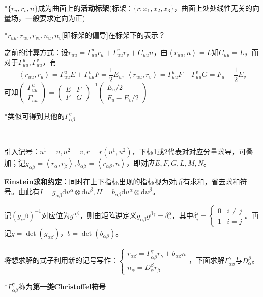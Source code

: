 \documentclass[a4paper,UTF8,fontset=windows]{ctexart}
\begin{document}
*$\{r_u,r_v,n\}$成为曲面上的\textbf{活动标架}(标架：$\{r;x_1,x_2,x_3\}$，曲面上处处线性无关的向量场，一般要求定向为正)

*$r_{uu},r_{uv},r_{vv},n_u,n_v$[即标架的偏导]在标架下的表示？

之前的计算方式：设$r_{uu}=\Gamma_{uu}^ur_u+\Gamma_{uu}^vr_v+C_{uu}n$，由$\left<r_{uu},n\right>=L$知$C_{uu}=L$，而对于$\Gamma_{uu}^u,\Gamma_{uu}^v$，有
$$\left<r_{uu},r_u\right>=\Gamma_{uu}^uE+\Gamma_{uu}^vF=\frac{1}{2}E_u,\ \left<r_{uu},r_v\right>=\Gamma_{uu}^uF+\Gamma_{uu}^vG=F_u-\frac{1}{2}E_v$$
可知$\begin{pmatrix}\Gamma_{uu}^u\\\Gamma_{uu}^v\end{pmatrix}=\begin{pmatrix}E&F\\F&G\end{pmatrix}^{-1}\begin{pmatrix}E_u/2\\F_u-E_v/2\end{pmatrix}$

*类似可得到其他的$\Gamma_{\alpha\beta}^\gamma$

\

引入记号：$u^1=u,u^2=v,r=r(u^1,u^2)$，下标1或2代表对对应分量求导，可叠加；记$g_{\alpha\beta}=\left<r_\alpha,r_\beta\right>,b_{\alpha\beta}=\left<r_{\alpha\beta},n\right>$，即对应$E,F,G,L,M,N$。

\textbf{Einstein求和约定}：同时在上下指标出现的指标视为对所有求和，省去求和符号。由此有$I=g_{\alpha\beta}\mathrm{d}u^\alpha\otimes\mathrm{d}u^\beta,II=b_{\alpha\beta}\mathrm{d}u^\alpha\otimes\mathrm{d}u^\beta$。

记$(g_{\alpha}\beta)^{-1}$对应位为$g^{\alpha\beta}$，则由矩阵逆定义$g_{\alpha\beta}g^{\beta\gamma}=\delta_\gamma^\alpha$，其中$\delta_i^j=\begin{cases}0&i\ne j\\1&i=j\end{cases}$。再记$g=\det(g_{\alpha\beta})$，$b=\det(b_{\alpha\beta})$。

将想求解的式子利用新的记号写作：$\begin{cases}r_{\alpha\beta}=\Gamma_{\alpha\beta}^\gamma r_\gamma+b_{\alpha\beta}n\\n_\alpha=D_\alpha^\beta r_\beta\end{cases}$，下面求解$\Gamma_{\alpha\beta}^\gamma$与$D_\alpha^\beta$。

*$\Gamma_{\alpha\beta}^\gamma$称为\textbf{第一类Christoffel符号}
\end{document}
